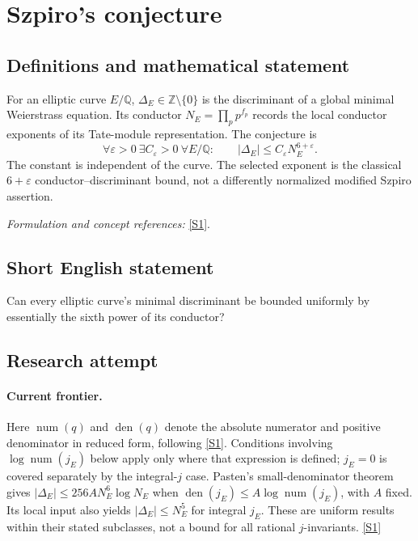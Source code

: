 \documentclass[11pt,a4paper]{article}
\newcommand{\Z}{\mathbb{Z}}
\newcommand{\Q}{\mathbb{Q}}
\newcommand{\sref}[2]{\hyperlink{source:#1:#2}{[S#2]}}
\newif\ifshowcatalogue
\newcommand{\cataloguescope}[1]{\ifshowcatalogue
 \paragraph{Exact scope in the supplied catalogue.}
 \begin{quote}\small #1\end{quote}\fi}
\numberwithin{equation}{section}
\begin{document}
\setcounter{section}{0}
\clearpage
\section*{\texorpdfstring{Szpiro's conjecture}{Szpiro's conjecture}}\label{statement}
\subsection{Definitions and mathematical statement}
For an elliptic curve $E/\Q$, $\Delta_E\in\Z\setminus\{0\}$ is the discriminant of a global minimal Weierstrass equation. Its conductor $N_E=\prod_p p^{f_p}$ records the local conductor exponents of its Tate-module representation. The conjecture is
\[
 \forall\varepsilon>0\ \exists C_\varepsilon>0\ \forall E/\Q:\qquad
 |\Delta_E|\le C_\varepsilon N_E^{6+\varepsilon}.
\]
The constant is independent of the curve. The selected exponent is the classical $6+\varepsilon$ conductor--discriminant bound, not a differently normalized modified Szpiro assertion.
\par\smallskip\textit{Formulation and concept references:} \sref{statement}{1}.
\cataloguescope{Prove or disprove that for every epsilon>0 there is C(epsilon)>0 such that every elliptic curve E over Q with minimal discriminant Delta\_E and conductor N\_E satisfies |Delta\_E| <= C(epsilon)*N\_E\textasciicircum{}(6+epsilon).}
\subsection{Short English statement}
Can every elliptic curve's minimal discriminant be bounded uniformly by essentially the sixth power of its conductor?
\subsection{Research attempt}

\paragraph{Current frontier.}
Here $\operatorname{num}(q)$ and $\operatorname{den}(q)$ denote the absolute
numerator and positive denominator in reduced form, following \sref{statement}{1}.
Conditions involving $\log\operatorname{num}(j_E)$ below apply only where
that expression is defined; $j_E=0$ is covered separately by the integral-$j$
case.
Pasten's small-denominator theorem gives
$|\Delta_E|\leq256A N_E^6\log N_E$ when
$\operatorname{den}(j_E)\leq A\log\operatorname{num}(j_E)$, with $A$ fixed.
Its local input also yields $|\Delta_E|\leq N_E^5$ for integral $j_E$.
These are uniform results within their stated subclasses, not a bound for
all rational $j$-invariants. \sref{statement}{1}
\end{document}
